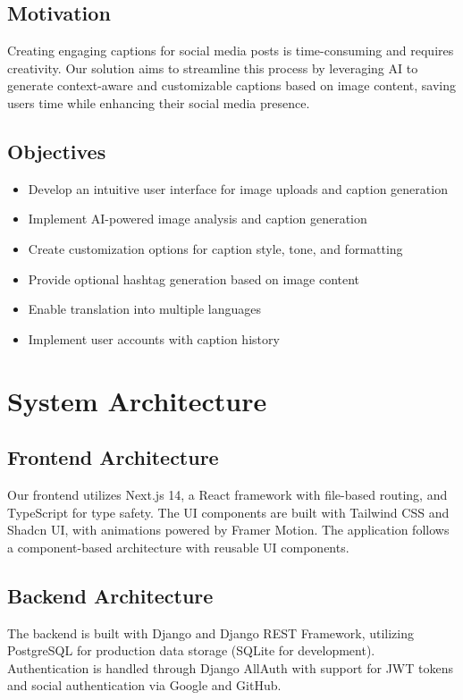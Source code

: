 \documentclass[12pt,a4paper]{report}
\begin{document}
\section{Motivation}
Creating engaging captions for social media posts is time-consuming and requires creativity. Our solution aims to streamline this process by leveraging AI to generate context-aware and customizable captions based on image content, saving users time while enhancing their social media presence.

\section{Objectives}
\begin{itemize}
    \item Develop an intuitive user interface for image uploads and caption generation
    \item Implement AI-powered image analysis and caption generation
    \item Create customization options for caption style, tone, and formatting
    \item Provide optional hashtag generation based on image content
    \item Enable translation into multiple languages
    \item Implement user accounts with caption history
\end{itemize}

\chapter{System Architecture}
\section{Frontend Architecture}
Our frontend utilizes Next.js 14, a React framework with file-based routing, and TypeScript for type safety. The UI components are built with Tailwind CSS and Shadcn UI, with animations powered by Framer Motion. The application follows a component-based architecture with reusable UI components.

\section{Backend Architecture}
The backend is built with Django and Django REST Framework, utilizing PostgreSQL for production data storage (SQLite for development). Authentication is handled through Django AllAuth with support for JWT tokens and social authentication via Google and GitHub.
\end{document}

